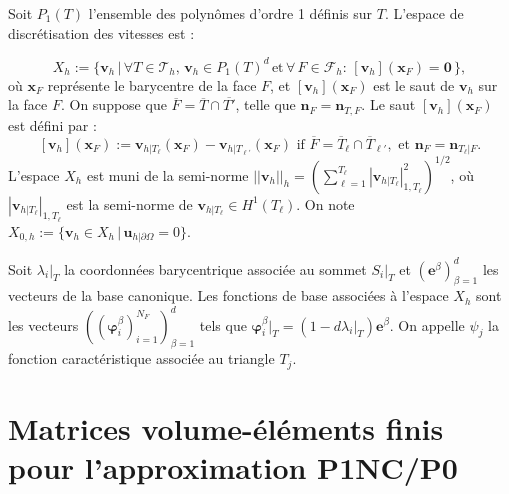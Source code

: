 Soit $P_{1}(T)$ l'ensemble des polyn\^omes d'ordre 1 d\'efinis sur $T$.
L'espace de discr\'etisation des vitesses est :

\begin{equation}
X_{h}:=\{\mathbf{v}_{h}\,|\,\forall T\in\mathcal{T}_{h},\,\mathbf{v}_{h}\in P_{1}(T)^{d}\,\mbox{et}\,\forall\,F\in\mathcal{F}{}_{h}:\,[\mathbf{v}_{h}](\mathbf{x}_{F})=\mathbf{0}\,\},\label{eq:CrRa}
\end{equation}
o\`u $\mathbf{x}_{F}$ repr\'esente le barycentre de la face $F$, et
$[\mathbf{v}_{h}](\mathbf{x}_{F})$ est le saut de $\mathbf{v}_{h}$
sur la face $F$. On suppose que $\overline{F}=\overline{T}\cap\overline{T'}$,
telle que $\mathbf{n}_{F}=\mathbf{n}_{T,F}$. Le saut $[\mathbf{v}_{h}](\mathbf{x}_{F})$
est d\'efini par : 
\[
[\mathbf{v}_{h}](\mathbf{x}_{F}):=\mathbf{v}_{h|T_{\ell}}(\mathbf{x}_{F})-\mathbf{v}_{h|T_{\ell'}}(\mathbf{x}_{F})\mbox{ if }\overline{F}=\overline{T}_{\ell}\cap\overline{T}_{\ell'},\mbox{ et }\mathbf{n}_{F}=\mathbf{n}_{T_{\ell}|F}.
\]
L'espace $X_{h}$ est muni de la semi-norme $||\mathbf{v}_{h}||_{h}=\left(\sum_{\ell=1}^{T_{\ell}}|\mathbf{v}_{h|T_{\ell}}|_{1,T_{\ell}}^{2}\right)^{1/2}$,
o\`u $|\mathbf{v}_{h|T_{\ell}}|_{1,T_{\ell}}$ est la semi-norme de
$\mathbf{v}_{h|T_{\ell}}\in H^{1}(T_{\ell})$. On note $X_{0,h}:=\{\mathbf{v}_{h}\in X_{h}\,|\,\mathbf{u}_{h|\partial\Omega}=0\}$. 

Soit $\lambda_{i}|_{T}$ la coordonn\'ees barycentrique associ\'ee au
sommet $S_{i}|_{T}$ et $\left(\mathbf{e}^{\beta}\right)_{\beta=1}^{d}$
les vecteurs de la base canonique. Les fonctions de base associ\'ees
\`a l'espace $X_{h}$ sont les vecteurs $\left(\left(\boldsymbol{\varphi}_{i}^{\beta}\right)_{i=1}^{N_{F}}\right)_{\beta=1}^{d}$
tels que $\boldsymbol{\varphi}_{i}^{\beta}|_{T}=\left(1-d\lambda_{i}|_{T}\right)\mathbf{e}^{\beta}$.
On appelle $\psi_{j}$ la fonction caract\'eristique associ\'ee au triangle
$T_{j}$.


\section{Matrices volume-\'el\'ements finis pour l'approximation P1NC/P0}

